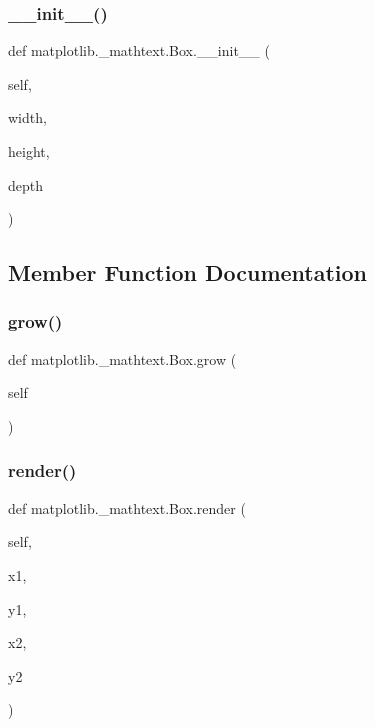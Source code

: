 \subsubsection{\texorpdfstring{\+\_\+\+\_\+init\+\_\+\+\_\+()}{\_\_init\_\_()}}
{\footnotesize\ttfamily def matplotlib.\+\_\+mathtext.\+Box.\+\_\+\+\_\+init\+\_\+\+\_\+ (\begin{DoxyParamCaption}\item[{}]{self,  }\item[{}]{width,  }\item[{}]{height,  }\item[{}]{depth }\end{DoxyParamCaption})}



\subsection{Member Function Documentation}
\mbox{\label{classmatplotlib_1_1__mathtext_1_1Box_a01709908879fcc7848cbbf720278bb5f}} 
\subsubsection{\texorpdfstring{grow()}{grow()}}
{\footnotesize\ttfamily def matplotlib.\+\_\+mathtext.\+Box.\+grow (\begin{DoxyParamCaption}\item[{}]{self }\end{DoxyParamCaption})}

\mbox{\label{classmatplotlib_1_1__mathtext_1_1Box_a32b41fabb550d033c449b83ed098e174}} 
\subsubsection{\texorpdfstring{render()}{render()}}
{\footnotesize\ttfamily def matplotlib.\+\_\+mathtext.\+Box.\+render (\begin{DoxyParamCaption}\item[{}]{self,  }\item[{}]{x1,  }\item[{}]{y1,  }\item[{}]{x2,  }\item[{}]{y2 }\end{DoxyParamCaption})}

